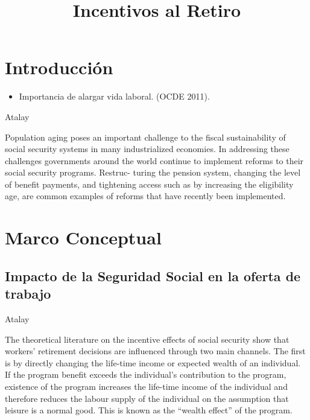 \documentclass[]{article}
\title{Incentivos al Retiro}
\author{}
\date{\vspace{-2.5em}}
\providecommand{\tightlist}{%
  \setlength{\itemsep}{0pt}\setlength{\parskip}{0pt}}
\begin{document}
\maketitle

{
\setcounter{tocdepth}{3}
\tableofcontents
}
\hypertarget{introducciuxf3n}{%
\section{Introducción}\label{introducciuxf3n}}

\begin{itemize}
\tightlist
\item
  Importancia de alargar vida laboral. (OCDE 2011).
\end{itemize}

Atalay

Population aging poses an important challenge to the fiscal
sustainability of social security systems in many industrialized
economies. In addressing these challenges governments around the world
continue to implement reforms to their social security programs.
Restruc- turing the pension system, changing the level of benefit
payments, and tightening access such as by increasing the eligibility
age, are common examples of reforms that have recently been implemented.

\hypertarget{marco-conceptual}{%
\section{Marco Conceptual}\label{marco-conceptual}}

\hypertarget{impacto-de-la-seguridad-social-en-la-oferta-de-trabajo}{%
\subsection{Impacto de la Seguridad Social en la oferta de
trabajo}\label{impacto-de-la-seguridad-social-en-la-oferta-de-trabajo}}

Atalay

The theoretical literature on the incentive effects of social security
show that workers' retirement decisions are influenced through two main
channels. The first is by directly changing the life-time income or
expected wealth of an individual. If the program benefit exceeds the
individual's contribution to the program, existence of the program
increases the life-time income of the individual and therefore reduces
the labour supply of the individual on the assumption that leisure is a
normal good. This is known as the ``wealth effect'' of the program.
\end{document}
